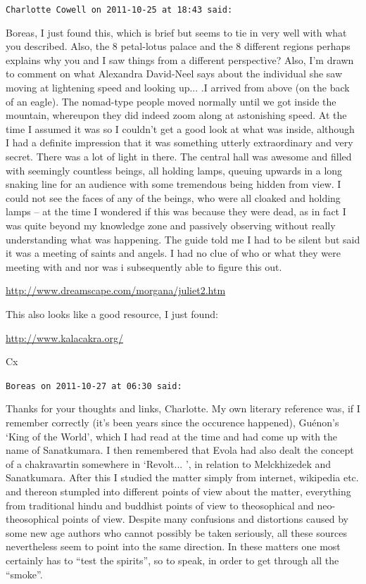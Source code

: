 \begin{footnotesize}
\begin{sffamily}
\hfill

\texttt{Charlotte Cowell on 2011-10-25 at 18:43 said:}

Boreas, I just found this, which is brief but seems to tie in very well with what you described. Also, the 8 petal-lotus palace and the 8 different regions perhaps explains why you and I saw things from a different perspective? Also, I'm drawn to comment on what Alexandra David-Neel says about the individual she saw moving at lightening speed and looking up... .I arrived from above (on the back of an eagle). The nomad-type people moved normally until we got inside the mountain, whereupon they did indeed zoom along at astonishing speed. At the time I assumed it was so I couldn't get a good look at what was inside, although I had a definite impression that it was something utterly extraordinary and very secret. There was a lot of light in there. The central hall was awesome and filled with seemingly countless beings, all holding lamps, queuing upwards in a long snaking line for an audience with some tremendous being hidden from view. I could not see the faces of any of the beings, who were all cloaked and holding lamps -- at the time I wondered if this was because they were dead, as in fact I was quite beyond my knowledge zone and passively observing without really understanding what was happening. The guide told me I had to be silent but said it was a meeting of saints and angels. I had no clue of who or what they were meeting with and nor was i subsequently able to figure this out.

\url{http://www.dreamscape.com/morgana/juliet2.htm}


This also looks like a good resource, I just found:

\url{http://www.kalacakra.org/}


Cx

\hfill

\texttt{Boreas on 2011-10-27 at 06:30 said:}

Thanks for your thoughts and links, Charlotte. My own literary reference was, if I remember correctly (it's been years since the occurence happened), Guénon's `King of the World', which I had read at the time and had come up with the name of Sanatkumara. I then remembered that Evola had also dealt the concept of a chakravartin somewhere in `Revolt... ', in relation to Melckhizedek and Sanatkumara. After this I studied the matter simply from internet, wikipedia etc. and thereon stumpled into different points of view about the matter, everything from traditional hindu and buddhist points of view to theosophical and neo-theosophical points of view. Despite many confusions and distortions caused by some new age authors who cannot possibly be taken seriously, all these sources nevertheless seem to point into the same direction. In these matters one most certainly has to ``test the spirits'', so to speak, in order to get through all the ``smoke''.


\end{sffamily}
\end{footnotesize}
